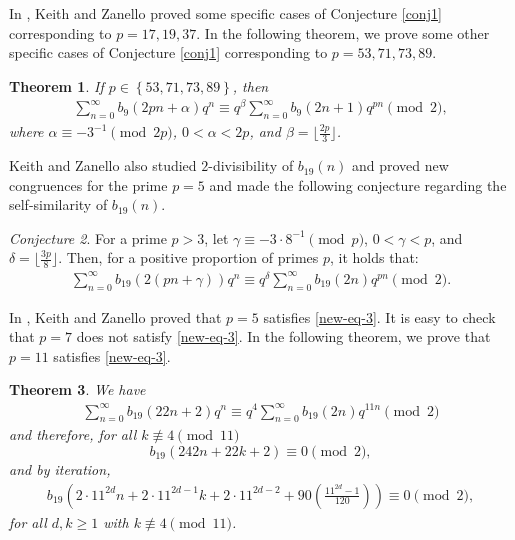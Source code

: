 \documentclass[reqno]{amsart}
\newtheorem{theorem}{Theorem}[section]
\theoremstyle{definition}
\theoremstyle{remark}
\newtheorem{conj}[theorem]{Conjecture}
\numberwithin{equation}{section}
\begin{document}
In \cite[Theorem 8]{Keith2021}, Keith and Zanello proved some specific cases of Conjecture \ref{conj1} corresponding to $p=17, 19, 37$. In the following theorem, we prove some other specific cases of Conjecture \ref{conj1} corresponding to $p=53, 71, 73, 89$. 
\begin{theorem}\label{thm1}
	If $p\in\left\lbrace  53, 71, 73, 89\right\rbrace$, then
\begin{align*}
\sum_{n=0}^{\infty}b_{9}\left(2pn+\alpha \right)q^{n}\equiv q^{\beta}\sum_{n=0}^{\infty}b_{9}\left(2n+1\right)q^{pn} \pmod2,
\end{align*}
where $\alpha\equiv -3^{-1}\pmod{2p}$, $0<\alpha<2p$, and $\beta=\lfloor \frac{2p}{3}\rfloor$.
\end{theorem}
Keith and Zanello \cite{Keith2021} also studied $2$-divisibility of $b_{19}(n)$ and proved new congruences for the prime $p=5$ and made the following conjecture regarding the self-similarity of $b_{19}(n)$. 
\begin{conj}\cite[Conjecture 11]{Keith2021}\label{conj2}
For a prime $p>3$, let $\gamma\equiv-3\cdot 8^{-1}\pmod{p}$, $0<\gamma<p$, and $\delta= \lfloor \frac{3p}{8}\rfloor$. Then, for a positive proportion of primes $p$, it holds that:
\begin{align}\label{new-eq-3}
\sum_{n=0}^{\infty}b_{19}(2(pn+\gamma))q^n\equiv q^{\delta}\sum_{n=0}^{\infty}b_{19}(2n)q^{pn}\pmod 2.
\end{align}
\end{conj}
In \cite[Theorem 10]{Keith2021}, Keith and Zanello proved that $p=5$ satisfies \eqref{new-eq-3}. It is easy to check that $p=7$ does not satisfy \eqref{new-eq-3}. In the following theorem, we prove that  $p=11$ satisfies \eqref{new-eq-3}.
\begin{theorem} \label{thm2}
We have
\begin{align*}
\sum_{n=0}^{\infty}b_{19}\left(22n+2 \right)q^{n}\equiv q^{4}\sum_{n=0}^{\infty}b_{19}\left(2n\right)q^{11n} \pmod2
\end{align*}
and therefore, for all $k\not\equiv 4\pmod{11}$
	$$b_{19}(242n+22k+2)\equiv0\pmod{2},$$
	and by iteration,
	\begin{align*}b_{19}\left(2\cdot11^{2d}n+2\cdot 11^{2d-1}k+2\cdot11^{2d-2}+90\left(\frac{11^{2d}-1}{120}\right)\right)\equiv 0\pmod{2},
	\end{align*}
	for all $d,k\geq1$ with $k\not\equiv4\pmod{11}$.
\end{theorem}
\end{document}

